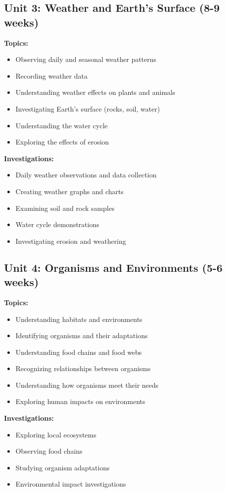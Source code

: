 \documentclass[11pt,letterpaper]{report}
\begin{document}
\subsection{Unit 3: Weather and Earth's Surface (8-9 weeks)}

\textbf{Topics:}
\begin{itemize}
    \item Observing daily and seasonal weather patterns
    \item Recording weather data
    \item Understanding weather effects on plants and animals
    \item Investigating Earth's surface (rocks, soil, water)
    \item Understanding the water cycle
    \item Exploring the effects of erosion
\end{itemize}

\textbf{Investigations:}
\begin{itemize}
    \item Daily weather observations and data collection
    \item Creating weather graphs and charts
    \item Examining soil and rock samples
    \item Water cycle demonstrations
    \item Investigating erosion and weathering
\end{itemize}

\subsection{Unit 4: Organisms and Environments (5-6 weeks)}

\textbf{Topics:}
\begin{itemize}
    \item Understanding habitats and environments
    \item Identifying organisms and their adaptations
    \item Understanding food chains and food webs
    \item Recognizing relationships between organisms
    \item Understanding how organisms meet their needs
    \item Exploring human impacts on environments
\end{itemize}

\textbf{Investigations:}
\begin{itemize}
    \item Exploring local ecosystems
    \item Observing food chains
    \item Studying organism adaptations
    \item Environmental impact investigations
\end{itemize}
\end{document}

